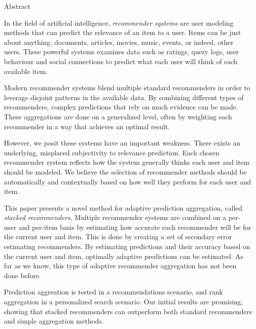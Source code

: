 \null\vspace{3em}
{
  \centering
  \normalfont
  \huge
  Abstract\\
}
\vspace{2em}

\noindent
In the field of artificial intelligence,
\emph{recommender systems} are user modeling methods
that can predict the relevance of an item to a user.
Items can be just about anything: documents, articles, movies, music, events,
or indeed, other users.
These powerful systems examines data such as ratings, query logs,
user behaviour and social connections to predict
what each user will think of each available item.

Modern recommender systems blend multiple standard recommenders
in order to leverage disjoint patterns in the available data.
By combining different types of recommenders,
complex predictions that rely on much evidence can be made.
These aggregations are done on a generalized level,
often by weighting each recommender in a way
that achieves an optimal result.

However, we posit these systems have an important weakness.
There exists an underlying, misplaced subjectivity to relevance prediction.
Each chosen recommender system reflects how the system
generally thinks each user and item should be modeled.
We believe the selection of recommender methods should 
be automatically and contextually based on how well they perform for each user and item.

This paper presents a novel method for adaptive prediction aggregation,
called \emph{stacked recommenders}.
Multiple recommender systems are combined on a per-user and per-item basis
by estimating how accurate each recommender will be for the current user and item.
This is done by creating a set of secondary error estimating recommenders.
By estimating predictions and their accuracy based 
on the current user and item,
optimally adaptive predictions can be estimated.
As far as we know, this type of adaptive recommender aggregation
has not been done before.

Prediction aggreation is tested in a recommendations scenario,
and rank aggregation in a personalized search scenario.
Our initial results are promising, showing that stacked recommenders
can outperform both standard recommenders and simple aggregation methods.

\clearpage

